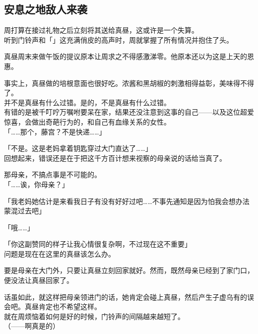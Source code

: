 \subsection{安息之地敌人来袭}

周打算在接过礼物之后立刻将其送给真昼，这或许是一个失算。\\

听到门铃声和「」这充满俏皮的高声时，周就掌握了所有情况并抱住了头。\\

\vspace{2\baselineskip}

真昼周末来做午饭的提议原本让周求之不得感激涕零。他原本还以为这是上天的恩惠。

事实上，真昼做的培根意面也很好吃。浓酱和黑胡椒的刺激相得益彰，美味得不得了。\\

并不是真昼有什么过错。是的，不是真昼有什么过错。\\

有错的是被千叮咛万嘱咐要呆在家，结果还没注意到这事的自己——以及这位超爱惊喜，会做出奇葩行为的，和自己有血缘关系的女性。\\

「……那个，藤宫？不是快递……」

「不是。这是老妈拿着钥匙穿过大门直达了……」\\

回想起来，错误还是在于把这千方百计想来视察的母亲说的话给当真了。

那母亲，不搞点事是不可能的。\\

「……诶，你母亲？」

「我老妈她估计是来看我日子有没有好好过吧……不事先通知是因为怕我会想办法蒙混过去吧」

「哦……」

「你这副赞同的样子让我心情很复杂啊，不过现在这不重要」\\

问题是现在在这里的真昼该怎么办。

要是母亲在大门外，只要让真昼立刻回家就好。然而，既然母亲已经到了家门口，便没法让真昼回家了。

话虽如此，就这样把母亲领进门的话，她肯定会碰上真昼，然后产生子虚乌有的误会吧。真昼肯定也不希望这样。\\

就在周烦恼着如何是好的时候，门铃声的间隔越来越短了。\\

（——啊真是的）


